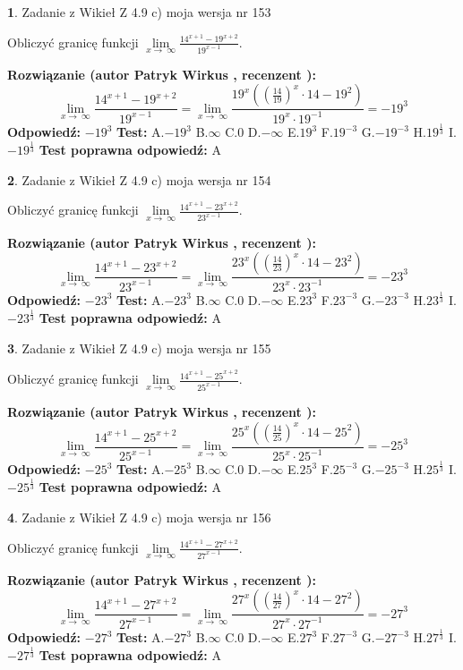 \documentclass[12pt, a4paper]{article}
\theoremstyle{definition} %
\newtheorem{zad}{}
\newcommand{\zadStart}[1]{\begin{zad}#1\newline}
\newcommand{\zadStop}{\end{zad}}
\newcommand{\rozwStart}[2]{\noindent \textbf{Rozwiązanie (autor #1 , recenzent #2): }\newline}
\newcommand{\rozwStop}{\newline}
\newcommand{\odpStart}{\noindent \textbf{Odpowiedź:}\newline}
\newcommand{\odpStop}{\newline}
\newcommand{\testStart}{\noindent \textbf{Test:}\newline}
\newcommand{\testStop}{\newline}
\newcommand{\kluczStart}{\noindent \textbf{Test poprawna odpowiedź:}\newline}
\newcommand{\kluczStop}{\newline}
\begin{document}
\zadStart{Zadanie z Wikieł Z 4.9 c) moja wersja nr 153}


Obliczyć granicę funkcji  $\lim\limits_{x\to\ \infty}\frac{14^{x+1}-19^{x+2}}{19^{x-1}}$.
\zadStop
\rozwStart{Patryk Wirkus}{}
$$\lim\limits_{x\to\ \infty}\frac{14^{x+1}-19^{x+2}}{19^{x-1}}=\lim\limits_{x\to\ \infty}\frac{19^{x}((\frac{14}{19})^{x}\cdot 14 -19^{2})}{19^{x}\cdot 19^{-1}} = -19^{3}$$
\rozwStop
\odpStart
$-19^{3}$
\odpStop
\testStart
A.$-19^{3}$ B.$\infty$ C.$0$ D.$-\infty$ E.$19^{3}$
F.$19^{-3}$ G.$-19^{-3}$
H.$19^{\frac{1}{3}}$
I.$-19^{\frac{1}{3}}$
\testStop
\kluczStart
A
\kluczStop



\zadStart{Zadanie z Wikieł Z 4.9 c) moja wersja nr 154}


Obliczyć granicę funkcji  $\lim\limits_{x\to\ \infty}\frac{14^{x+1}-23^{x+2}}{23^{x-1}}$.
\zadStop
\rozwStart{Patryk Wirkus}{}
$$\lim\limits_{x\to\ \infty}\frac{14^{x+1}-23^{x+2}}{23^{x-1}}=\lim\limits_{x\to\ \infty}\frac{23^{x}((\frac{14}{23})^{x}\cdot 14 -23^{2})}{23^{x}\cdot 23^{-1}} = -23^{3}$$
\rozwStop
\odpStart
$-23^{3}$
\odpStop
\testStart
A.$-23^{3}$ B.$\infty$ C.$0$ D.$-\infty$ E.$23^{3}$
F.$23^{-3}$ G.$-23^{-3}$
H.$23^{\frac{1}{3}}$
I.$-23^{\frac{1}{3}}$
\testStop
\kluczStart
A
\kluczStop



\zadStart{Zadanie z Wikieł Z 4.9 c) moja wersja nr 155}


Obliczyć granicę funkcji  $\lim\limits_{x\to\ \infty}\frac{14^{x+1}-25^{x+2}}{25^{x-1}}$.
\zadStop
\rozwStart{Patryk Wirkus}{}
$$\lim\limits_{x\to\ \infty}\frac{14^{x+1}-25^{x+2}}{25^{x-1}}=\lim\limits_{x\to\ \infty}\frac{25^{x}((\frac{14}{25})^{x}\cdot 14 -25^{2})}{25^{x}\cdot 25^{-1}} = -25^{3}$$
\rozwStop
\odpStart
$-25^{3}$
\odpStop
\testStart
A.$-25^{3}$ B.$\infty$ C.$0$ D.$-\infty$ E.$25^{3}$
F.$25^{-3}$ G.$-25^{-3}$
H.$25^{\frac{1}{3}}$
I.$-25^{\frac{1}{3}}$
\testStop
\kluczStart
A
\kluczStop



\zadStart{Zadanie z Wikieł Z 4.9 c) moja wersja nr 156}


Obliczyć granicę funkcji  $\lim\limits_{x\to\ \infty}\frac{14^{x+1}-27^{x+2}}{27^{x-1}}$.
\zadStop
\rozwStart{Patryk Wirkus}{}
$$\lim\limits_{x\to\ \infty}\frac{14^{x+1}-27^{x+2}}{27^{x-1}}=\lim\limits_{x\to\ \infty}\frac{27^{x}((\frac{14}{27})^{x}\cdot 14 -27^{2})}{27^{x}\cdot 27^{-1}} = -27^{3}$$
\rozwStop
\odpStart
$-27^{3}$
\odpStop
\testStart
A.$-27^{3}$ B.$\infty$ C.$0$ D.$-\infty$ E.$27^{3}$
F.$27^{-3}$ G.$-27^{-3}$
H.$27^{\frac{1}{3}}$
I.$-27^{\frac{1}{3}}$
\testStop
\kluczStart
A
\kluczStop
\end{document}
